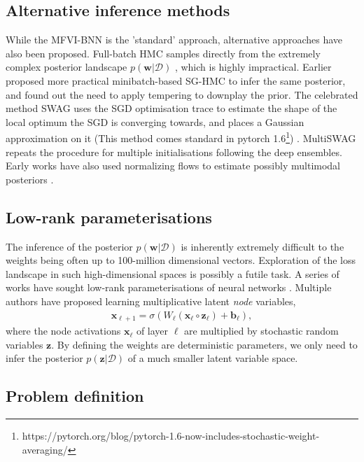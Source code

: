 \documentclass{article}
\def\x{\mathbf{x}}
\def\D{\mathcal{D}}
\def\z{\mathbf{z}}
\def\w{\mathbf{w}}
\begin{document}
\subsection{Alternative inference methods}

While the MFVI-BNN is the 'standard' approach, alternative approaches have also been proposed. Full-batch HMC samples directly from the extremely complex posterior landscape $p(\w|\D)$ \citep{izmailov2021}, which is highly impractical. Earlier \citet{wenzel2020good} proposed more practical minibatch-based SG-HMC to infer the same posterior, and found out the need to apply tempering to downplay the prior. The celebrated method SWAG uses the SGD optimisation trace to estimate the shape of the local optimum the SGD is converging towards, and places a Gaussian approximation on it (This method comes standard in pytorch 1.6\footnote{ https://pytorch.org/blog/pytorch-1.6-now-includes-stochastic-weight-averaging/}) \citep{maddox2019simple}. MultiSWAG repeats the procedure for multiple initialisations following the deep ensembles. Early works have also used normalizing flows to estimate possibly multimodal posteriors \citep{louizos2017}.

\subsection{Low-rank parameterisations}

The inference of the posterior $p(\w|\D)$ is inherently extremely difficult to the weights being often up to 100-million dimensional vectors. Exploration of the loss landscape in such high-dimensional spaces is possibly a futile task. A series of works have sought low-rank parameterisations of neural networks \citep{dusenberry2020,karaletsos2018probabilistic,karaletsos2020hierarchical,trung2020}. Multiple authors have proposed learning multiplicative latent \emph{node} variables,
\begin{align}
    \x_{\ell+1} = \sigma( W_\ell (\x_\ell \circ \z_\ell) + \mathbf{b}_\ell),
\end{align}
where the node activations $\x_\ell$ of layer $\ell$ are multiplied by stochastic random variables $\z$. By defining the weights are deterministic parameters, we only need to infer the posterior $p(\z|\D)$ of a much smaller latent variable space. 

\subsection{Problem definition}
\end{document}
